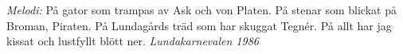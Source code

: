 {\footnotesize\textit{Melodi: }}
\vspace{10pt}
På gator som trampas av Ask och von Platen.
På stenar som blickat på Broman, Piraten.
På Lundagårds träd som har skuggat Tegnér.
På allt har jag kissat och lustfyllt blött ner.
\vspace{10pt}
{\footnotesize\textit{Lundakarnevalen 1986}}
